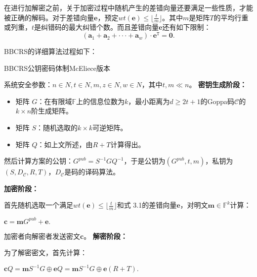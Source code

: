 在进行加解密之前，关于加密过程中随机产生的差错向量还要满足一些性质，才能被正确的解码。对于差错向量$\mathbf{e}$，预定$wt(\mathbf{e}) \leq \lfloor \frac{t}{m} \rfloor$。其中$m$是矩阵$T$的平均行重或列重，$t$是纠错码的最大纠错个数。而且差错向量$\mathbf{e}$还有如下限制：
\begin{equation}
	(\mathbf{a}_1 + \mathbf{a}_2 + ··· + \mathbf{a}_w) \cdot \mathbf{e}^\mathtt{T} = \mathbf{0}.
\end{equation}

\begin{flushleft}
	BBCRS的详细算法过程如下：
\end{flushleft}
\begin{breakablealgorithm}
	\small
	\renewcommand{\algorithmicrequire}{\textbf{Input:}}
	\renewcommand{\algorithmicensure}{\textbf{Output:}}
	\caption{BBCRS公钥密码体制McEliece版本}
	\label{alg:BBCRS}
	\begin{algorithmic}	
		\State
		系统安全参数：$n \in N, t \in N, m, z \in N, w \in N$，其中$t,m \ll n$。
		\State
		\textbf{密钥生成阶段：}
		
		\begin{itemize}
			\item 矩阵 $G$：在有限域$\mathbb{F}$上的信息位数为$k$，最小距离为$d \geq 2t + 1$的Goppa码$\mathcal{C}$的$k \times n$阶生成矩阵。
			\item 矩阵 $S$：随机选取的$k \times k$可逆矩阵。
			\item 矩阵 $Q$：如上文所述，由$R + T$计算得出。
		\end{itemize}
		
		然后计算方案的公钥：$G^{pub} = S^{-1}GQ^{-1}$，于是公钥为$(G^{pub}, t, m)$，私钥为$(S,D_\mathcal{C},R,T)$，$D_\mathcal{C}$是码的译码算法。
		
		\State
		\textbf{加密阶段：}
		
		首先随机选取一个满足$wt(\mathbf{e}) \leq \lfloor \frac{t}{m} \rfloor$和式 3.1的差错向量$\mathbf{e}$，对明文$\mathbf{m} \in \mathbb{F}^k$计算：
		
		\begin{center}
			$\mathbf{c} = \mathbf{m}G^{pub} + \mathbf{e}.$
		\end{center}
		
		加密者向解密者发送密文$\mathbf{c}$。
		\State
		\textbf{解密阶段：}
		
		为了解密密文，首先计算：
		\begin{center}
			$\mathbf{c}Q = \mathbf{m}S^{-1}G \oplus\mathbf{e}Q = \mathbf{m}S^{-1}G \oplus\mathbf{e}(R + T).$
		\end{center}
		

\end{algorithmic}
\end{breakablealgorithm}
